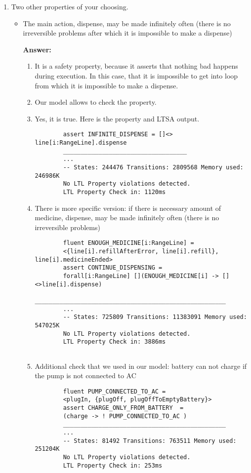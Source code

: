 \documentclass{article}
\begin{document}
\begin{enumerate}
    \item Two other properties of your choosing.
    
    \begin{itemize}
    \item The main action, dispense, may be made infinitely often (there is no irreversible problems after which it is
    impossible to make a dispense)
    
    \textbf{Answer:}
    \begin{enumerate}
    	\item It is a safety property, because it asserts that nothing bad happens during execution. In this case, that it is
    	impossible to get into loop from which it is impossible to make a dispense.
    	\item Our model allows to check the property. 
    	\item Yes, it is true. Here is the property and LTSA output.
    	\begin{verbatim}    	
    	assert INFINITE_DISPENSE = []<> line[i:RangeLine].dispense
    	___________________________________
    	...
    	-- States: 244476 Transitions: 2809568 Memory used: 246986K
    	No LTL Property violations detected.
    	LTL Property Check in: 1120ms
    	 \end{verbatim}
    	 
    	 \item There is more specific version: if there is necessary amount of medicine, dispense, may be made infinitely
    	 often (there is no irreversible problems)
    	 
    	 \begin{verbatim}
    	fluent ENOUGH_MEDICINE[i:RangeLine] =
    	<{line[i].refillAfterError, line[i].refill}, line[i].medicineEnded>
    	assert CONTINUE_DISPENSING =
    	forall[i:RangeLine] [](ENOUGH_MEDICINE[i] -> [] <>line[i].dispense)
    	______________________________________________________
    	...
    	-- States: 725809 Transitions: 11383091 Memory used: 547025K
    	No LTL Property violations detected.
    	LTL Property Check in: 3886ms
    	
    	\end{verbatim}
    	
    	\item Additional check that we used in our model: battery can not charge if the pump is not connected to AC
    	
    	 \begin{verbatim}
    	fluent PUMP_CONNECTED_TO_AC =
    	<plugIn, {plugOff, plugOffToEmptyBattery}>
    	assert CHARGE_ONLY_FROM_BATTERY  = 
    	(charge -> ! PUMP_CONNECTED_TO_AC )
    	______________________________________________
    	...
    	-- States: 81492 Transitions: 763511 Memory used: 251204K
    	No LTL Property violations detected.
    	LTL Property Check in: 253ms
    	\end{verbatim}
    	\end{enumerate}
    	\end{itemize}
    	    
\end{enumerate}
\end{document}
